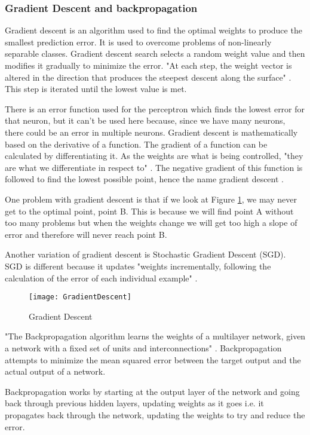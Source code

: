 \tocless\subsubsection{Gradient Descent and backpropagation}
Gradient descent is an algorithm used to find the optimal weights to produce the
smallest prediction error. It is used to overcome problems of non-linearly
separable classes. Gradient descent search selects a random weight value and
then modifies it gradually to minimize the error. "At each step, the weight
vector is altered in the direction that produces the steepest descent along the
surface" \parencite{MLANN}. This step is iterated until the lowest value is met.

There is an error function used for the perceptron which finds the lowest error for that neuron, but it can't be used here because, since we have many neurons, there could be an error in multiple neurons.
Gradient descent is mathematically based on the derivative of a function.
The gradient of a function can be calculated by differentiating it.
As the weights are what is being controlled, "they are what we differentiate in respect to" \parencite{MLAlgorithm}.
The negative gradient of this function is followed to find the lowest possible point, hence the name gradient descent \parencite{MLAlgorithm}.

One problem with gradient descent is that if we look at Figure \ref{fig:GD}, we may
never get to the optimal point, point B. This is because we will find point A
without too many problems but when the weights change we will get too high a
slope of error and therefore will never reach point B.

Another variation of gradient descent is Stochastic Gradient Descent (SGD). SGD
is different because it updates "weights incrementally, following the
calculation of the error of each individual example" \parencite{MLANN}. 

\begin{figure}[h]
      \texttt{[image: GradientDescent]}
      \caption{Gradient Descent}
      \label{fig:GD}
 \end{figure}

"The Backpropagation algorithm learns the weights of a multilayer network,
given a network with a fixed set of units and interconnections" \parencite{MLANN}.
Backpropagation attempts to minimize the mean squared error between the target
output and the actual output of a network.

Backpropagation works by starting at the output layer of the network and going
back through previous hidden layers, updating weights as it goes i.e. it propagates back through the network, updating the weights to try and reduce the error.


